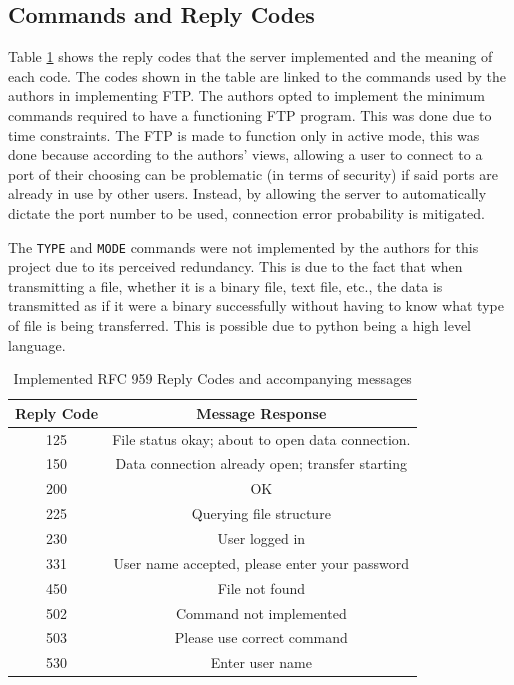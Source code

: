 \documentclass[journal, a4paper]{IEEEtran}
\begin{document}
\subsection{Commands and Reply Codes}
Table \ref{replycodes} shows the reply codes that the server implemented and the meaning of each code. The codes shown in the table are linked to the commands used by the authors in implementing FTP. The authors opted to implement the minimum commands required to have a functioning FTP program. This was done due to time constraints. The FTP is made to function only in active mode, this was done because according to the authors’ views, allowing a user to connect to a port of their choosing can be problematic (in terms of security) if said ports are already in use by other users. Instead, by allowing the server to automatically dictate the port number to be used, connection error probability is mitigated.

The \texttt{TYPE} and \texttt{MODE} commands were not implemented by the authors for this project due to its perceived redundancy. This is due to the fact that when transmitting a file, whether it is a binary file, text file, etc., the data is transmitted as if it were a binary successfully without having to know what type of file is being transferred. This is possible due to python being a high level language.

\begin{table}[htbp]
  \centering
  \caption{Implemented RFC 959 Reply Codes and accompanying messages}
    \begin{tabular}{|c|c|}
    \hline
    \multicolumn{1}{|l|}{\textbf{Reply Code}} & \textbf{Message Response} \\
    \hline
    125   & File status okay; about to open data connection. \\
    \hline
    150   & Data connection already open; transfer starting \\
    \hline
    200   & OK \\
    \hline
    225   & Querying file structure \\
    \hline
    230   & User logged in \\
    \hline
    331   & User name accepted, please enter your password \\
    \hline
    450   & File not found \\
    \hline
    502   & Command not implemented \\
    \hline
    503   & Please use correct command \\
    \hline
    530   & Enter user name \\
    \hline
    \end{tabular}%
  \label{replycodes}%
\end{table}%
\end{document}
